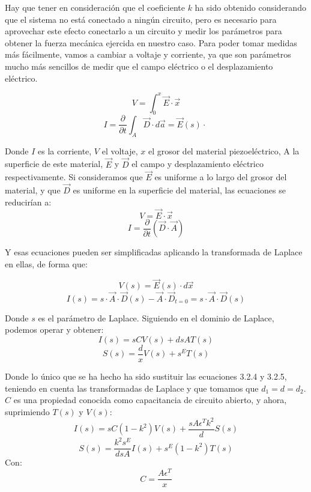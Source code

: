 \documentclass[12pt]{book}
\numberwithin{equation}{section}
\begin{document}
Hay que tener en consideración que el coeficiente $k$ ha sido obtenido considerando que el sistema no está conectado a ningún circuito, pero es necesario para aprovechar este efecto conectarlo a un circuito y medir los parámetros para obtener la fuerza mecánica ejercida en nuestro caso. Para poder tomar medidas más fácilmente, vamos a cambiar a voltaje y corriente, ya que son parámetros mucho más sencillos de medir que el campo eléctrico o el desplazamiento eléctrico.

\begin{equation}
V = \int _0 ^x \vec{E} \cdot \vec{x}
\end{equation}
\begin{equation}
I = \frac{\partial}{\partial t} \int _A \vec{D} \cdot d\vec{a} = \vec{E}(s) \cdot \ 
\end{equation}

Donde $I$ es la corriente, $V$ el voltaje, $x$ el grosor del material piezoeléctrico, A la superficie de este material, $\vec{E}$ y $\vec{D}$ el campo y desplazamiento eléctrico respectivamente. Si consideramos que $\vec{E}$ es uniforme a lo largo del grosor del material, y que $\vec{D}$ es uniforme en la superficie del material, las ecuaciones se reducirían a:
\begin{equation}
V=\vec{E}\cdot \vec{x}
\end{equation}
\begin{equation}
I=\frac{\partial}{\partial t}\left(\vec{D}\cdot\vec{A}\right)
\end{equation}

Y esas ecuaciones pueden ser simplificadas aplicando la transformada de Laplace en ellas, de forma que:

\begin{equation}
V(s)=\vec{E}(s)\cdot d\vec{x}
\end{equation}
\begin{equation}
I(s)=s\cdot\vec{A}\cdot\vec{D}(s)-\vec{A}\cdot\vec{D}_{t=0}=s\cdot\vec{A}\cdot\vec{D}(s)
\end{equation}

Donde $s$ es el parámetro de Laplace. Siguiendo en el dominio de Laplace, podemos operar y obtener:
\begin{equation}
I(s) = sCV(s) + dsAT(s)
\end{equation}
\begin{equation}
S(s)=\frac{d}{x}V(s) + s^E T(s)
\end{equation}

Donde lo único que se ha hecho ha sido sustituir las ecuaciones 3.2.4 y 3.2.5, teniendo en cuenta las transformadas de Laplace y que tomamos que $d_1=d=d_2$. $C$ es una propiedad conocida como capacitancia de circuito abierto, y ahora, suprimiendo $T(s)$ y $V(s)$:
\begin{equation}
I(s)=sC(1-k^2)V(s) + \frac{sA\epsilon^Tk^2}{d}S(s)
\end{equation}
\begin{equation}
S(s)=\frac{k^2s^E}{dsA} I(s) + s^E(1-k^2)T(s)
\end{equation}
Con:
\begin{equation}
C=\frac{A\epsilon^T}{x}
\end{equation}
\end{document}
